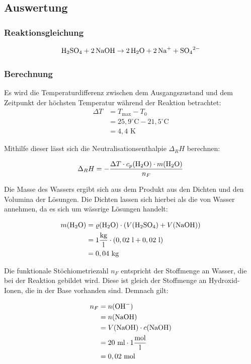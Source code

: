 \documentclass[a4paper]{article}
\begin{document}

\subsection*{Auswertung}
\subsubsection*{Reaktionsgleichung}
$$ \ce{H2SO4 + 2NaOH} \rightarrow \ce{2H2O + 2Na+ + SO4^2-} $$

\subsubsection*{Berechnung}
Es wird die Temperaturdifferenz zwischen dem Ausgangszustand und dem Zeitpunkt der höchsten Temperatur während der Reaktion betrachtet:
\begin{align*}
    \Delta T &= T_\textrm{max} - T_0 \\
    &= 25,9 ^\circ\textrm{C} - 21,5 ^\circ\textrm{C}\\
    &= 4,4 \textrm{ K}
\end{align*}

Mithilfe dieser lässt sich die Neutralisationsenthalpie $\Delta_R H$ berechnen:

$$ \Delta_R H = - \frac{\Delta T \cdot c_p(\ce{H2O}) \cdot m(\ce{H2O})}{n_F} $$

Die Masse des Wassers ergibt sich aus dem Produkt aus den Dichten und den Volumina der Lösungen. Die Dichten lassen sich hierbei als die von Wasser annehmen, da es sich um wässrige Lösungen handelt:

\begin{align*}
    m(\ce{H2O}) &= \varrho(\ce{H2O}) \cdot (V(\ce{H2SO4}) + V(\ce{NaOH})) \\
    &= 1 \frac{\textrm{kg}}{\textrm l} \cdot (0,02 \textrm{ l} + 0,02 \textrm{ l}) \\
    &= 0,04 \textrm{ kg}
\end{align*}

Die funktionale Stöchiometriezahl $n_F$ entspricht der Stoffmenge an Wasser, die bei der Reaktion gebildet wird. Diese ist gleich der Stoffmenge an Hydroxid-Ionen, die in der Base vorhanden sind. Demnach gilt:

\begin{align*}
    n_F &= n(\ce{OH-}) \\
    &= n(\ce{NaOH}) \\
    &= V(\ce{NaOH}) \cdot c(\ce{NaOH}) \\
    &= 20 \textrm{ ml} \cdot 1 \frac{\textrm{mol}}{\textrm l}\\
    &= 0,02 \textrm{ mol}
\end{align*}
\end{document}
